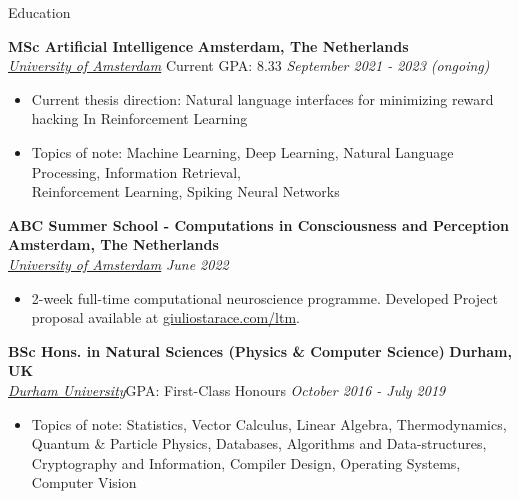 \documentclass{resume} %
\begin{document}
\begin{rSection}{Education}

	{\bf MSc Artificial Intelligence} \hfill \textbf{Amsterdam, The Netherlands}
	\\\href{https://www.dur.ac.uk/}{\textit{University of Amsterdam}} \hfill Current GPA: 8.33 \hfill {\em September 2021
		- 2023 (ongoing)}
	\begin{itemize}
		\item Current thesis direction: Natural language interfaces for minimizing reward hacking In
		      Reinforcement Learning
		\item Topics of note: Machine Learning, Deep Learning, Natural Language Processing, Information
		      Retrieval,\\ Reinforcement Learning, Spiking Neural Networks
	\end{itemize}

	{\bf ABC Summer School - Computations in Consciousness and Perception} \hfill \textbf{Amsterdam, The Netherlands}
	\\\href{https://www.dur.ac.uk/}{\textit{University of Amsterdam}} \hfill {\em June 2022}
	\begin{itemize}
		\item 2-week full-time computational neuroscience programme. Developed Project proposal
		      available at \href{https://www.giuliostarace.com/ltm/}{giuliostarace.com/ltm}.
	\end{itemize}

	{\bf BSc Hons. in Natural Sciences (Physics \& Computer Science)} \hfill \textbf{Durham, UK}
	\\\href{https://www.dur.ac.uk/}{\textit{Durham University}}\hfill GPA: First-Class Honours \hfill {\em October 2016 - July 2019}
	\begin{itemize}\vspace{-0.5em}
		\item Topics of note: Statistics, Vector Calculus, Linear Algebra, Thermodynamics, Quantum \&
		      Particle Physics, Databases, Algorithms and Data-structures, Cryptography and Information,
		      Compiler Design, Operating Systems, Computer Vision
	\end{itemize}
\end{rSection}
\end{document}

